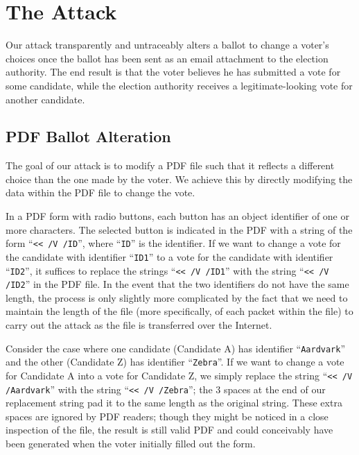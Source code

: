 \documentclass{article}
\begin{document}
\section{The Attack}

Our attack transparently and untraceably alters a ballot to change a
voter's choices once the ballot has been sent as an email attachment
to the election authority. The end result is that the voter believes
he has submitted a vote for some candidate, while the election
authority receives a legitimate-looking vote for another candidate.

\subsection{PDF Ballot Alteration}

The goal of our attack is to modify a PDF file such that it reflects a
different choice than the one made by the voter. We achieve this by
directly modifying the data within the PDF file to change the
vote. 

In a PDF form with radio buttons, each button has an object identifier
of one or more characters. The selected button is indicated in the PDF
with a string of the form ``\texttt{<{}< /V /ID}'', where
``\texttt{ID}'' is the identifier. If we want to change a vote for the
candidate with identifier ``\texttt{ID1}'' to a vote for the candidate
with identifier ``\texttt{ID2}'', it suffices to replace the strings
``\texttt{<{}< /V /ID1}'' with the string ``\texttt{<{}< /V /ID2}'' in
the PDF file. In the event that the two identifiers do not have the
same length, the process is only slightly more complicated by the fact
that we need to maintain the length of the file (more specifically, of
each packet within the file) to carry out the attack as the file is
transferred over the Internet.

Consider the case where one candidate (Candidate A) has identifier
``\texttt{Aardvark}'' and the other (Candidate Z) has identifier
``\texttt{Zebra}''. If we want to change a vote for Candidate A
into a vote for Candidate Z, we simply replace the string ``\texttt{<{}<
  /V /Aardvark}'' with the string ``\texttt{<{}< /V
  /Zebra\textvisiblespace\textvisiblespace\textvisiblespace}'';
the 3 spaces at the end of our replacement string pad it to the same
length as the original string. These extra spaces are ignored by PDF
readers; though they might be noticed in a close inspection of the
file, the result is still valid PDF and could conceivably have been
generated when the voter initially filled out the form.
\end{document}
